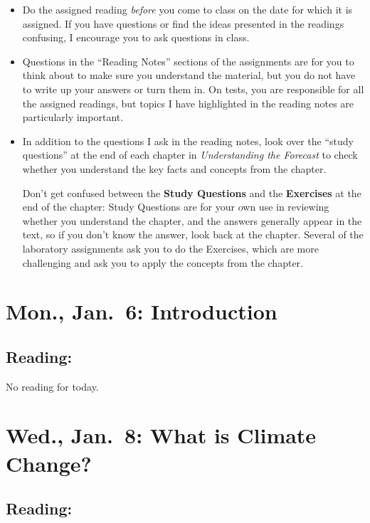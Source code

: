 \documentclass[
]{article}
\begin{document}
\begin{itemize}
\item
  Do the assigned reading \emph{before} you come to class on the date
  for which it is assigned. If you have questions or find the ideas
  presented in the readings confusing, I encourage you to ask questions
  in class.
\item
  Questions in the ``Reading Notes'' sections of the assignments are for
  you to think about to make sure you understand the material, but you
  do not have to write up your answers or turn them in. On tests, you
  are responsible for all the assigned readings, but topics I have
  highlighted in the reading notes are particularly important.
\item
  In addition to the questions I ask in the reading notes, look over the
  ``study questions'' at the end of each chapter in \emph{Understanding
  the Forecast} to check whether you understand the key facts and
  concepts from the chapter.

  Don't get confused between the \textbf{Study Questions} and the
  \textbf{Exercises} at the end of the chapter: Study Questions are for
  your own use in reviewing whether you understand the chapter, and the
  answers generally appear in the text, so if you don't know the answer,
  look back at the chapter. Several of the laboratory assignments ask
  you to do the Exercises, which are more challenging and ask you to
  apply the concepts from the chapter.
\end{itemize}

\hypertarget{mon.-jan.-6-introduction}{%
\section{Mon., Jan.~6: Introduction}\label{mon.-jan.-6-introduction}}

\hypertarget{reading}{%
\subsection{Reading:}\label{reading}}

No reading for today.

\hypertarget{wed.-jan.-8-what-is-climate-change}{%
\section{Wed., Jan.~8: What is Climate
Change?}\label{wed.-jan.-8-what-is-climate-change}}

\hypertarget{reading-1}{%
\subsection{Reading:}\label{reading-1}}
\end{document}
